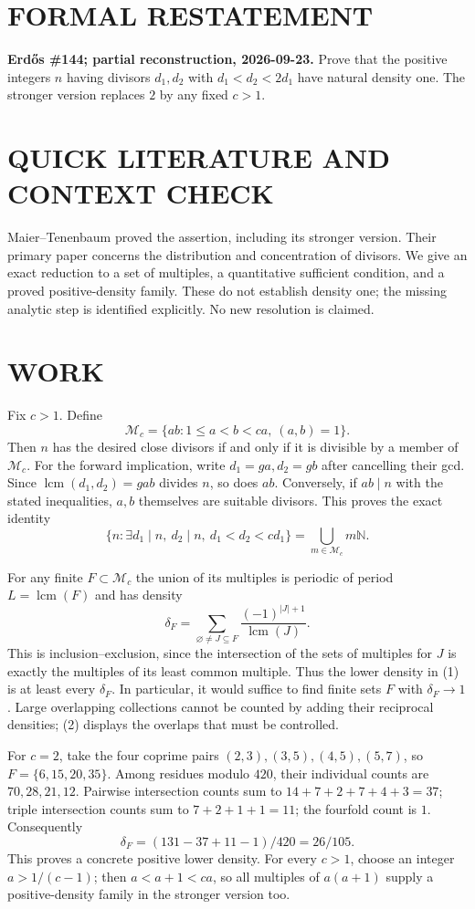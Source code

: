\section{FORMAL RESTATEMENT}
\textbf{Erd\H{o}s \#144; partial reconstruction, 2026-09-23.}
Prove that the positive integers $n$ having divisors $d_1,d_2$ with
$d_1<d_2<2d_1$ have natural density one. The stronger version replaces
$2$ by any fixed $c>1$.

\section{QUICK LITERATURE AND CONTEXT CHECK}
Maier--Tenenbaum proved the assertion, including its stronger version.
Their primary paper concerns the distribution and concentration of
divisors. We give an exact reduction to a set of multiples, a quantitative
sufficient condition, and a proved positive-density family. These do
not establish density one; the missing analytic step is identified
explicitly. No new resolution is claimed.

\section{WORK}
Fix $c>1$. Define
\[
 \mathcal M_c=\{ab:1\le a<b<ca,\ (a,b)=1\}.
\]
Then $n$ has the desired close divisors if and only if it is divisible
by a member of $\mathcal M_c$. For the forward implication, write
$d_1=ga,d_2=gb$ after cancelling their gcd. Since
$\operatorname{lcm}(d_1,d_2)=gab$ divides $n$, so does $ab$.
Conversely, if $ab\mid n$ with the stated inequalities, $a,b$ themselves
are suitable divisors. This proves the exact identity
\[
 \{n:\exists d_1\mid n,\ d_2\mid n,\ d_1<d_2<cd_1\}
 =\bigcup_{m\in\mathcal M_c}m\mathbb N.                 \tag{1}
\]

For any finite $F\subset\mathcal M_c$ the union of its multiples is
periodic of period $L=\operatorname{lcm}(F)$ and has density
\[
 \delta_F=\sum_{\varnothing\ne J\subseteq F}
          \frac{(-1)^{|J|+1}}{\operatorname{lcm}(J)}.      \tag{2}
\]
This is inclusion--exclusion, since the intersection of the sets of
multiples for $J$ is exactly the multiples of its least common multiple.
Thus the lower density in (1) is at least every $\delta_F$.
In particular, it would suffice to find finite sets $F$ with
$\delta_F\to1$. Large overlapping collections cannot be counted by
adding their reciprocal densities; (2) displays the overlaps that
must be controlled.

For $c=2$, take the four coprime pairs $(2,3),(3,5),(4,5),(5,7)$,
so $F=\{6,15,20,35\}$. Among residues modulo $420$, their individual
counts are $70,28,21,12$. Pairwise intersection counts sum to
$14+7+2+7+4+3=37$; triple intersection counts sum to
$7+2+1+1=11$; the fourfold count is $1$. Consequently
\[
 \delta_F=(131-37+11-1)/420=26/105.                       \tag{3}
\]
This proves a concrete positive lower density. For every $c>1$, choose
an integer $a>1/(c-1)$; then $a<a+1<ca$, so all multiples of
$a(a+1)$ supply a positive-density family in the stronger version too.

